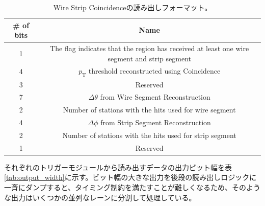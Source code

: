 \begin{table}[]
    \centering
    \caption[Wire Strip Coincidenceの読み出しフォーマット]{Wire Strip Coincidenceの読み出しフォーマット。}
    \label{tab:WS_format}
    \begin{tabular}{|c|c|}
    \hline
    \# of bits & Name                                                                                        \\ \hline\hline
    1          & The flag indicates that the region has received at least one wire segment and strip segment \\ \hline
    4          & $p_{\mathrm{T}}$ threshold reconstructed using Coincidence                                  \\ \hline
    3          & Reserved                                                                                    \\ \hline
    7          & $\Delta\theta$ from Wire Segment Reconstruction                                             \\ \hline
    2          & Number of stations with the hits used for wire segment                                      \\ \hline
    4          & $\Delta\phi$ from Strip Segment Reconstruction                                              \\ \hline
    2          & Number of stations with the hits used for strip segment                                     \\ \hline
    1          & Reserved                                                                                    \\ \hline
    \end{tabular}
\end{table}


それぞれのトリガーモジュールから読み出すデータの出力ビット幅を表\ref{tab:output_width}に示す。ビット幅の大きな出力を後段の読み出しロジックに一斉にダンプすると、タイミング制約を満たすことが難しくなるため、そのような出力はいくつかの並列なレーンに分割して処理している。

